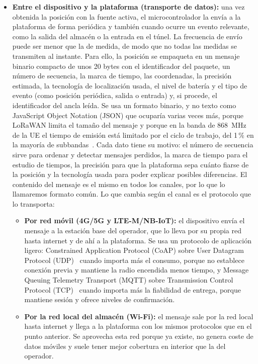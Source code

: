 \documentclass[11pt,a4paper]{article}
\begin{document}
\begin{itemize}
    \item \textbf{Entre el dispositivo y la plataforma (transporte de datos):} una vez obtenida la posición con la fuente activa, el microcontrolador la envía a la plataforma de forma periódica y también cuando ocurre un evento relevante, como la salida del almacén o la entrada en el túnel. La frecuencia de envío puede ser menor que la de medida, de modo que no todas las medidas se transmiten al instante. Para ello, la posición se empaqueta en un mensaje binario compacto de unos 20 bytes con el identificador del paquete, un número de secuencia, la marca de tiempo, las coordenadas, la precisión estimada, la tecnología de localización usada, el nivel de batería y el tipo de evento (como posición periódica, salida o entrada) y, si procede, el identificador del ancla leída. Se usa un formato binario, y no texto como JavaScript Object Notation (JSON) que ocuparía varias veces más, porque LoRaWAN limita el tamaño del mensaje y porque en la banda de 868~MHz de la UE el tiempo de emisión está limitado por el ciclo de trabajo, del 1\,\% en la mayoría de subbandas~\cite{ref26,ref27,ref28}. Cada dato tiene su motivo: el número de secuencia sirve para ordenar y detectar mensajes perdidos, la marca de tiempo para el estudio de tiempos, la precisión para que la plataforma sepa cuánto fiarse de la posición y la tecnología usada para poder explicar posibles diferencias. El contenido del mensaje es el mismo en todos los canales, por lo que lo llamaremos formato común. Lo que cambia según el canal es el protocolo que lo transporta:
    \begin{itemize}
        \item \textbf{Por red móvil (4G/5G y LTE-M/NB-IoT):} el dispositivo envía el mensaje a la estación base del operador, que lo lleva por su propia red hasta internet y de ahí a la plataforma. Se usa un protocolo de aplicación ligero: Constrained Application Protocol (CoAP) sobre User Datagram Protocol (UDP)~\cite{ref29} cuando importa más el consumo, porque no establece conexión previa y mantiene la radio encendida menos tiempo, y Message Queuing Telemetry Transport (MQTT) sobre Transmission Control Protocol (TCP)~\cite{ref30} cuando importa más la fiabilidad de entrega, porque mantiene sesión y ofrece niveles de confirmación.

        \item \textbf{Por la red local del almacén (Wi-Fi):} el mensaje sale por la red local hasta internet y llega a la plataforma con los mismos protocolos que en el punto anterior. Se aprovecha esta red porque ya existe, no genera coste de datos móviles y suele tener mejor cobertura en interior que la del operador.


\end{itemize}
\end{itemize}
\end{document}
